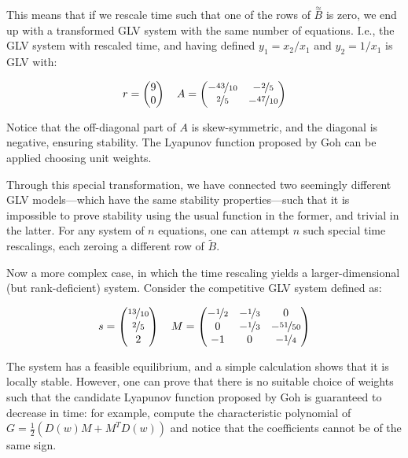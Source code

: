 \documentclass{article}
\begin{document}
This means that if we rescale time such that one of the rows of
\(\overset{\approx}{B}\) is zero, we end up with a transformed GLV
system with the same number of equations. I.e., the GLV system with
rescaled time, and having defined \(y_1 = x_2 / x_1\) and
\(y_2 = 1 / x_1\) is GLV with:

\begin{equation}
r = \begin{pmatrix}
9\\
0
\end{pmatrix} \quad
A = \begin{pmatrix}
-\nicefrac{43}{10} & -\nicefrac{2}{5}\\
\nicefrac{2}{5} & -\nicefrac{47}{10}
\end{pmatrix}
\end{equation}

Notice that the off-diagonal part of \(A\) is skew-symmetric, and the
diagonal is negative, ensuring stability. The Lyapunov function proposed
by Goh can be applied choosing unit weights.

Through this special transformation, we have connected two seemingly
different GLV models---which have the same stability properties---such
that it is impossible to prove stability using the usual function in the
former, and trivial in the latter. For any system of \(n\) equations,
one can attempt \(n\) such special time rescalings, each zeroing a
different row of \(\tilde{B}\).

Now a more complex case, in which the time rescaling yields a
larger-dimensional (but rank-deficient) system. Consider the competitive
GLV system defined as:

\begin{equation}
s = \begin{pmatrix}
\nicefrac{13}{10}\\
\nicefrac{2}{5}\\
2
\end{pmatrix} \quad
M = \begin{pmatrix}
-\nicefrac{1}{2} & -\nicefrac{1}{3} & 0\\
0 &  -\nicefrac{1}{3} &  -\nicefrac{51}{50}\\
-1 & 0 & -\nicefrac{1}{4}
\end{pmatrix} 
\end{equation}

The system has a feasible equilibrium, and a simple calculation shows
that it is locally stable. However, one can prove that there is no
suitable choice of weights such that the candidate Lyapunov function
proposed by Goh is guaranteed to decrease in time: for example, compute
the characteristic polynomial of \(G = \frac{1}{2}(D(w) M + M^T D(w))\)
and notice that the coefficients cannot be of the same sign.
\end{document}
